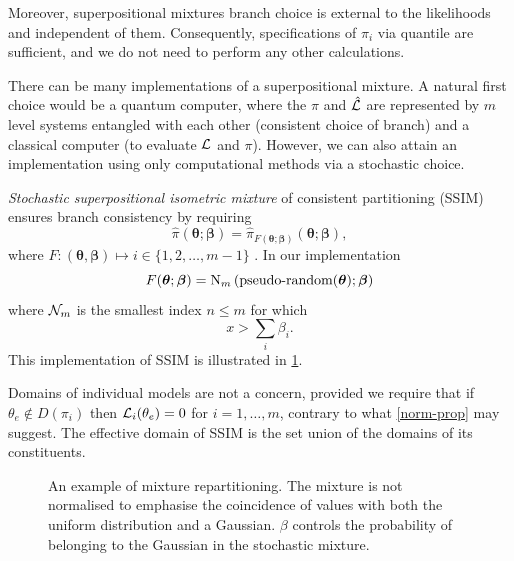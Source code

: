 \documentclass[usenatbib]{mnras}
\begin{document}
Moreover, superpositional mixtures branch choice is external to the
likelihoods and independent of them. Consequently, specifications of
$\pi_{i}$ via quantile are sufficient, and we do not need to perform
any other calculations.


There can be many implementations of a superpositional mixture. A
natural first choice would be a quantum computer, where the
$\hat{\pi}$ and $\hat{\cal L}$ are represented by \(m\) level
systems entangled with each other (consistent choice of branch) and a
classical computer (to evaluate ${\cal L}$ and $\pi$). However, we can
also attain an implementation using only computational methods via a
stochastic choice.

\emph{Stochastic superpositional isometric mixture} of consistent
partitioning (SSIM) ensures branch consistency by requiring
\begin{equation}
\hat{\pi}(\bm{\theta}; \bm{\beta}) = \hat{\pi}_{F(\bm{\theta};
  \bm{\beta})}(\bm{\theta};\bm{\beta}),
\end{equation}
where $F: (\bm{\theta}, \bm{\beta}) \mapsto i \in \{1, 2, \ldots, m-1\}$ . In our implementation
\begin{equation}
  F(\bm{\theta};\bm{\beta})= \text{{\cal N}}_{m}\left(\text{pseudo-random}(\bm{\theta}); \bm{\beta}\right)
\end{equation}
where \({\cal N}_{m}\) is the smallest index \(n \leq m\) for
which
\begin{equation}
x > \sum_{i}\beta_{i}.
\end{equation}
This implementation of SSIM is illustrated in \cref{fig:mixture}.

Domains of individual models are not a concern, provided we require
that if $\theta_{e} \not\in D(\pi_{i})$ then
${\cal L}_{i}(\theta_{e})=0$ for $i=1,\ldots,m$, contrary to what
\cref{norm-prop} may suggest. The effective domain of SSIM is the
set union of the domains of its constituents.

\begin{figure}  
  

  

  
  \caption{An example of mixture repartitioning. The mixture is not
    normalised to emphasise the coincidence of values with both the
    uniform distribution and a Gaussian. $\beta$ controls the
    probability of belonging to the Gaussian in the stochastic
    mixture.  \label{fig:mixture}}
\end{figure}
\end{document}
